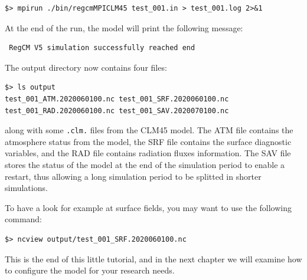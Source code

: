 \begin{Verbatim}
$> mpirun ./bin/regcmMPICLM45 test_001.in > test_001.log 2>&1
\end{Verbatim}

At the end of the run, the model will print the following message:

\begin{Verbatim}
 RegCM V5 simulation successfully reached end
\end{Verbatim}

The output directory now contains four files:

\begin{Verbatim}
$> ls output
test_001_ATM.2020060100.nc test_001_SRF.2020060100.nc
test_001_RAD.2020060100.nc test_001_SAV.2020070100.nc
\end{Verbatim}

along with some \verb=.clm.= files from the CLM45 model.
The ATM file contains the atmosphere status from the model, the SRF file
contains the surface diagnostic variables, and the RAD file contains radiation
fluxes information. The SAV file stores the status of the model at the end of
the simulation period to enable a restart, thus allowing a long simulation
period to be splitted in shorter simulations.

To have a look for example at surface fields, you may want to use the
following command:

\begin{Verbatim}
$> ncview output/test_001_SRF.2020060100.nc
\end{Verbatim}

This is the end of this little tutorial, and in the next chapter we will
examine how to configure the model for your research needs.
